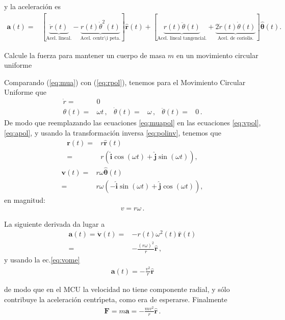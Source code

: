 y la aceleraci\'on es %
\begin{align}
\label{eq:apol}
  \mathbf{a}(t)=&%
[\underbrace{\ddot{r}(t)}_{{\text{Acel. lineal.}}}
-\underbrace{r(t)\dot{\theta}^2(t)}_{{\text{Acel. centr\'\i peta.}}}]\hat{\mathbf{r}}(t)
+[\underbrace{r(t)\ddot{\theta}(t)}_{{\text{Acel. lineal tangencial.}}}
+\underbrace{2\dot{r}(t)\dot{\theta}(t)}_{{\text{Acel. de coriolis.}}}]\hat{\boldsymbol{\theta}}(t).
\end{align}

Calcule la fuerza para mantener un cuerpo de masa $m$ en un movimiento circular uniforme


Comparando (\ref{eq:mua}) con (\ref{eq:rpol}), tenemos para el Movimiento Circular Uniforme que
\begin{align}
  \label{eq:muapol}
   \dot{r}=&0&&&&\\
  \theta(t)=&\omega t\,,&\dot{\theta}(t)=&\omega\,,&\ddot{\theta}(t)=&0\,.
\end{align}
De modo que reemplazando las ecuaciones \eqref{eq:muapol} en las ecuaciones \eqref{eq:vpol}, \eqref{eq:apol}, y usando la transformaci\'on inversa \eqref{eq:polinv}, tenemos que
\begin{align}
  \mathbf{r}(t)=&r\hat{\mathbf{r}}(t)\nonumber\\
  =&r\left(\hat{\mathbf{i}}\cos(\omega t)+\hat{\mathbf{j}}\sin(\omega t)\right),
\end{align}
\begin{align}
    \mathbf{v}(t)=&r\omega\hat{\boldsymbol{\theta}}(t)\nonumber\\
    =&r\omega\left(-\hat{\mathbf{i}}\sin(\omega t)+\hat{\mathbf{j}}\cos(\omega t)\right),
\end{align}
en magnitud:
\begin{align}
  \label{eq:vome}
  v=r\omega\,.
\end{align}

La siguiente derivada da lugar a 
\begin{align*}
  \mathbf{a}(t)=\dot{\mathbf{v}}(t)=&-r(t)\omega^2(t)\hat{\mathbf{r}}(t)\nonumber\\
  =&-\frac{(r\omega)^2}{r}\hat{\mathbf{r}}\,,
\end{align*}
y usando la ec.\eqref{eq:vome}
\begin{align}
  \mathbf{a}(t)=-\frac{v^2}{r}\hat{\mathbf{r}}
\end{align}

de modo que en el MCU la velocidad no tiene componente radial, y s\'olo
contribuye la aceleraci\'on centr\'\i peta, como era de esperarse. Finalmente
\begin{align}
  \mathbf{F}=m\mathbf{a}=-\frac{m v^2}{r}\hat{\mathbf{r}}\,.
\end{align}


